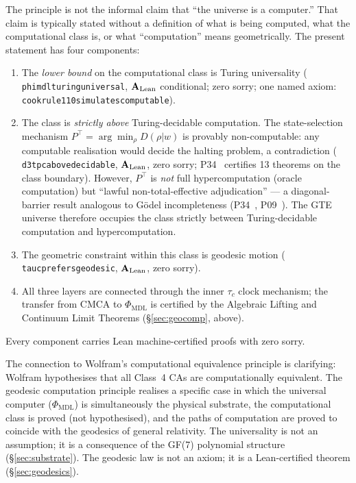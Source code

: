 \documentclass[11pt]{article}
\theoremstyle{remark}
\newcommand{\PHIMDL}{\Phi_{\mathrm{MDL}}}
\newcommand{\lean}[1]{%
  \penalty-100
  \begingroup\def\_{\textunderscore\allowbreak}\texttt{#1}\endgroup}
\newcommand{\CatAL}{\ensuremath{\textbf{A}_{\rm Lean}}}
\begin{document}
The principle is not the informal claim that ``the universe is a computer.''
That claim is typically stated without a definition of what is being computed,
what the computational class is, or what ``computation'' means geometrically.
The present statement has four components:
\begin{enumerate}[noitemsep,label=(\alph*)]
\item The \emph{lower bound} on the computational class is Turing universality
  (\lean{phimdl\_turing\_universal}, $\CatAL$ conditional; zero sorry; one named axiom:
  \lean{cook\_rule110\_simulates\_computable}).
\item The class is \emph{strictly above} Turing-decidable computation.
  The state-selection mechanism $P^\top = \arg\min_\rho D(\rho|w)$ is provably
  non-computable: any computable realisation would decide the halting problem,
  a contradiction (\lean{d3\_tpc\_above\_decidable}, $\CatAL$, zero sorry;
  P34~\cite{SpivackGTEMobius} certifies 13 theorems on the class boundary).
  However, $P^\top$ is \emph{not} full hypercomputation (oracle computation)
  but ``lawful non-total-effective adjudication'' --- a diagonal-barrier result
  analogous to G\"{o}del incompleteness (P34~\cite{SpivackGTEMobius},
  P09~\cite{Spivack2025_ArchitectureComputableUniverse}).
  The GTE universe therefore occupies the class strictly between
  Turing-decidable computation and hypercomputation.
\item The geometric constraint within this class is geodesic motion
  (\lean{tau\_c\_prefers\_geodesic}, $\CatAL$, zero sorry).
\item All three layers are connected through the inner $\tau_c$ clock mechanism;
  the transfer from CMCA to $\PHIMDL$ is certified by the Algebraic Lifting and
  Continuum Limit Theorems (\S\ref{sec:geocomp}, above).
\end{enumerate}
Every component carries Lean machine-certified proofs with zero sorry.

The connection to Wolfram's computational equivalence principle is clarifying:
Wolfram hypothesises that all Class~4 CAs are computationally equivalent.
The geodesic computation principle realises a specific case in which the
universal computer ($\PHIMDL$) is simultaneously the physical substrate,
the computational class is proved (not hypothesised), and the paths of
computation are proved to coincide with the geodesics of general relativity.
The universality is not an assumption; it is a consequence of the GF(7)
polynomial structure (\S\ref{sec:substrate}).  The geodesic law is not an
axiom; it is a Lean-certified theorem (\S\ref{sec:geodesics}).
\end{document}
